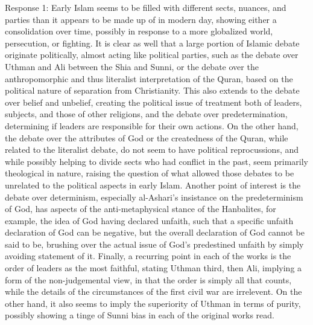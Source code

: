 \documentclass[11 pt, twoside]{article}
\begin{document}
Response 1:
	Early Islam seems to be filled with different sects, nuances, and parties than it appears to be made up of in modern day, showing either a consolidation over time, possibly in response to a more globalized world, persecution, or fighting. It is clear as well that a large portion of Islamic debate originate politically, almost acting like political parties, such as the debate over Uthman and Ali between the Shia and Sunni, or the debate over the anthropomorphic and thus literalist interpretation of the Quran, based on the political nature of separation from Christianity. This also extends to the debate over belief and unbelief, creating the political issue of treatment both of leaders, subjects, and those of other religions, and the debate over predetermination, determining if leaders are responsible for their own actions. On the other hand, the debate over the attributes of God or the createdness of the Quran, while related to the literalist debate, do not seem to have political reprocussions, and while possibly helping to divide sects who had conflict in the past, seem primarily theological in nature, raising the question of what allowed those debates to be unrelated to the political aspects in early Islam.
	Another point of interest is the debate over determinism, especially al-Ashari's insistance on the predeterminism of God, has aspects of the anti-metaphysical stance of the Hanbalites, for example, the idea of God having declared unfaith, such that a specific unfaith declaration of God can be negative, but the overall declaration of God cannot be said to be, brushing over the actual issue of God's predestined unfaith by simply avoiding statement of it. 
	Finally, a recurring point in each of the works is the order of leaders as the most faithful, stating Uthman third, then Ali, implying a form of the non-judgemental view, in that the order is simply all that counts, while the details of the circumstances of the first civil war are irrelevent. On the other hand, it also seems to imply the superiority of Uthman in terms of purity, possibly showing a tinge of Sunni bias in each of the original works read.
\end{document}
